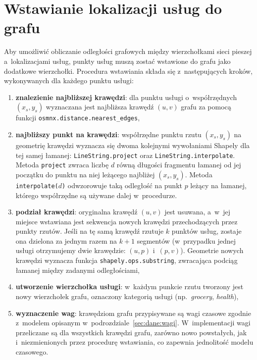 \section{Wstawianie lokalizacji usług do grafu}
\label{sec:dane:wstawianie}

Aby umożliwić obliczanie odległości grafowych między wierzchołkami sieci pieszej
a~lokalizacjami usług, punkty usług muszą zostać wstawione do grafu jako dodatkowe wierzchołki.
Procedura wstawiania składa się z~następujących kroków, wykonywanych dla każdego punktu usługi:

\begin{enumerate}
  \item \textbf{znalezienie najbliższej krawędzi}: dla punktu usługi o~współrzędnych
        $(x_s, y_s)$ wyznaczana jest najbliższa krawędź $(u,v)$ grafu za pomocą funkcji
        \texttt{osmnx.\allowbreak distance.\allowbreak nearest\_\allowbreak edges},

  \item \textbf{najbliższy punkt na krawędzi}: współrzędne punktu rzutu $(x_s, y_s)$
        na geometrię krawędzi wyznacza się dwoma kolejnymi wywołaniami Shapely dla tej samej
        łamanej: \texttt{LineString.project} oraz \texttt{LineString.interpolate}.
        Metoda \texttt{project} zwraca liczbę $d$ równą długości fragmentu łamanej
        od jej początku do punktu na niej leżącego najbliżej $(x_s, y_s)$.
        Metoda \texttt{interpolate($d$)} odwzorowuje taką odległość na punkt $p$ leżący
        na łamanej, którego współrzędne są używane dalej w~procedurze.

  \item \textbf{podział krawędzi}: oryginalna krawędź $(u,v)$ jest usuwana,
        a~w~jej miejsce wstawiana jest sekwencja nowych krawędzi przechodzących przez
        punkty rzutów. Jeśli na tę samą krawędź rzutuje $k$ punktów usług,
        zostaje ona dzielona za jednym razem na $k{+}1$ segmentów (w~przypadku jednej
        usługi otrzymujemy dwie krawędzie: $(u, p)$ i~$(p, v)$). Geometrie nowych krawędzi
        wyznacza funkcja \texttt{shapely.ops.substring}, zwracająca podciąg łamanej
        między zadanymi odległościami,

  \item \textbf{utworzenie wierzchołka usługi}: w~każdym punkcie rzutu tworzony jest
        nowy wierzchołek grafu, oznaczony kategorią usługi (np.\ \emph{grocery}, \emph{health}),

  \item \textbf{wyznaczenie wag}: krawędziom grafu przypisywane są wagi czasowe zgodnie
        z~modelem opisanym w~podrozdziale~\ref{sec:dane:wagi}. W~implementacji wagi
        przeliczane są dla wszystkich krawędzi grafu, zarówno nowo powstałych,
        jak i~niezmienionych przez procedurę wstawiania, co zapewnia jednolitość modelu
        czasowego.
\end{enumerate}


